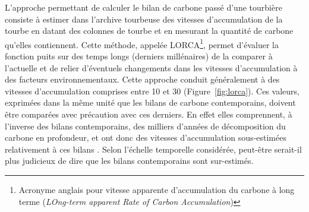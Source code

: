 L'approche permettant de calculer le bilan de carbone passé d'une tourbière consiste à estimer dans l'archive tourbeuse des vitesses d'accumulation de la tourbe en datant des colonnes de tourbe et en mesurant la quantité de carbone qu'elles contiennent.
Cette méthode, appelée LORCA\footnote{Acronyme anglais pour vitesse apparente d'accumulation du carbone à long terme (\textit{LOng-term apparent Rate of Carbon Accumulation})}, permet d'évaluer la fonction puits sur des temps longs (derniers millénaires) de la comparer à l'actuelle et de relier d'éventuels changements dans les vitesses d'accumulation à des facteurs environnementaux.
Cette approche conduit généralement à des vitesses d'accumulation comprises entre 10 et \SI{30}{\gcma} (Figure~\ref{fig:lorca}).
Ces valeurs, exprimées dans la même unité que les bilans de carbone contemporains, doivent être comparées avec précaution avec ces derniers.
En effet elles comprennent, à l'inverse des bilans contemporains, des milliers d'années de décomposition du carbone en profondeur, et ont donc des vitesses d'accumulation sous-estimées relativement à ces bilans \citep{yu2009}.
Selon l'échelle temporelle considérée, peut-être serait-il plus judicieux de dire que les bilans contemporains sont sur-estimés.

